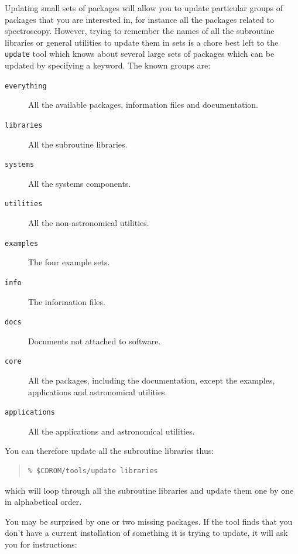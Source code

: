\documentclass[twoside,11pt]{article}
\renewcommand{\_}{\texttt{\symbol{95}}}
\begin{document}
Updating small sets of packages will allow you to update particular groups
of packages that you are interested in, for instance all the packages
related to spectroscopy.  However, trying to remember the names of all
the subroutine libraries or general utilities to update them in sets is
a chore best left to the \texttt{update} tool which knows about several
large sets of packages which can be updated by specifying a keyword.
The known groups are:

\begin{description}
 
\item[\texttt{everything}] All the available packages, information files and
documentation.

\item[\texttt{libraries}] All the subroutine libraries.
 
\item[\texttt{systems}] All the systems components.
 
\item[\texttt{utilities}] All the non-astronomical utilities.
 
\item[\texttt{examples}] The four example sets.
 
\item[\texttt{info}] The information files.
 
\item[\texttt{docs}] Documents not attached to software.
 
\item[\texttt{core}] All the packages, including the documentation, except
the examples, applications and astronomical utilities.
 
\item[\texttt{applications}] All the applications and astronomical
utilities.
 
\end{description}

You can therefore update all the subroutine libraries thus:

\begin{quote}
\begin{verbatim}
% $CDROM/tools/update libraries
\end{verbatim}
\end{quote}

which will loop through all the subroutine libraries and update them
one by one in alphabetical order.

You may be surprised by one or two missing packages.  If the tool finds
that you don't have a current installation of something it is trying to
update, it will ask you for instructions:
\end{document}
